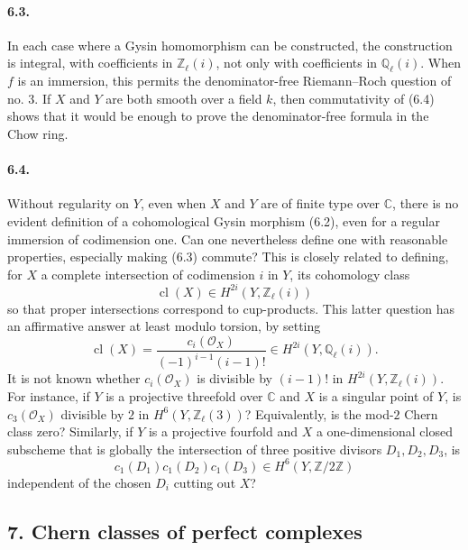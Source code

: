 \documentclass[12pt]{article}
\newcommand{\ZZ}{\mathbb Z}
\newcommand{\QQ}{\mathbb Q}
\newcommand{\CC}{\mathbb C}
\newcommand{\cO}{\mathcal O}
\newcommand{\cl}{\operatorname{cl}}
\begin{document}
\paragraph{6.3.}
In each case where a Gysin homomorphism can be constructed, the construction is integral, with coefficients in $\ZZ_\ell(i)$, not only with coefficients in $\QQ_\ell(i)$. When $f$ is an immersion, this permits the denominator-free Riemann--Roch question of no. 3. If $X$ and $Y$ are both smooth over a field $k$, then commutativity of (6.4) shows that it would be enough to prove the denominator-free formula in the Chow ring.

\paragraph{6.4.}
Without regularity on $Y$, even when $X$ and $Y$ are of finite type over $\CC$, there is no evident definition of a cohomological Gysin morphism (6.2), even for a regular immersion of codimension one. Can one nevertheless define one with reasonable properties, especially making (6.3) commute? This is closely related to defining, for $X$ a complete intersection of codimension $i$ in $Y$, its cohomology class
\[
\cl(X)\in H^{2i}(Y,\ZZ_\ell(i))
\]
so that proper intersections correspond to cup-products. This latter question has an affirmative answer at least modulo torsion, by setting
\[
\cl(X)=\frac{c_i(\cO_X)}{(-1)^{i-1}(i-1)!}\in H^{2i}(Y,\QQ_\ell(i)).
\]
It is not known whether $c_i(\cO_X)$ is divisible by $(i-1)!$ in $H^{2i}(Y,\ZZ_\ell(i))$. For instance, if $Y$ is a projective threefold over $\CC$ and $X$ is a singular point of $Y$, is $c_3(\cO_X)$ divisible by $2$ in $H^6(Y,\ZZ_\ell(3))$? Equivalently, is the mod-$2$ Chern class zero? Similarly, if $Y$ is a projective fourfold and $X$ a one-dimensional closed subscheme that is globally the intersection of three positive divisors $D_1,D_2,D_3$, is
\[
c_1(D_1)c_1(D_2)c_1(D_3)\in H^6(Y,\ZZ/2\ZZ)
\]
independent of the chosen $D_i$ cutting out $X$?

\subsection*{7. Chern classes of perfect complexes}
\end{document}
